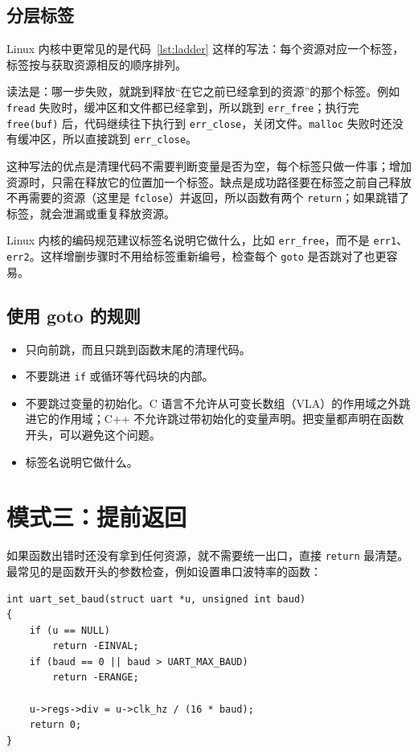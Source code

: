 \subsection{分层标签}

Linux 内核中更常见的是代码~\ref{lst:ladder} 这样的写法：每个资源对应一个标签，标签按与获取资源相反的顺序排列。


读法是：哪一步失败，就跳到释放“在它之前已经拿到的资源”的那个标签。例如 \texttt{fread} 失败时，缓冲区和文件都已经拿到，所以跳到 \texttt{err\_free}；执行完 \texttt{free(buf)} 后，代码继续往下执行到 \texttt{err\_close}，关闭文件。\texttt{malloc} 失败时还没有缓冲区，所以直接跳到 \texttt{err\_close}。

这种写法的优点是清理代码不需要判断变量是否为空，每个标签只做一件事；增加资源时，只需在释放它的位置加一个标签。缺点是成功路径要在标签之前自己释放不再需要的资源（这里是 \texttt{fclose}）并返回，所以函数有两个 \texttt{return}；如果跳错了标签，就会泄漏或重复释放资源。

Linux 内核的编码规范建议标签名说明它做什么，比如 \texttt{err\_free}，而不是 \texttt{err1}、\texttt{err2}。这样增删步骤时不用给标签重新编号，检查每个 \texttt{goto} 是否跳对了也更容易。

\subsection{使用 goto 的规则}

\begin{itemize}
  \item 只向前跳，而且只跳到函数末尾的清理代码。
  \item 不要跳进 \texttt{if} 或循环等代码块的内部。
  \item 不要跳过变量的初始化。C 语言不允许从可变长数组（VLA）的作用域之外跳进它的作用域；C++ 不允许跳过带初始化的变量声明。把变量都声明在函数开头，可以避免这个问题。
  \item 标签名说明它做什么。
\end{itemize}

\section{模式三：提前返回}
\label{sec:early-return}

如果函数出错时还没有拿到任何资源，就不需要统一出口，直接 \texttt{return} 最清楚。最常见的是函数开头的参数检查，例如设置串口波特率的函数：
\begin{verbatim}
int uart_set_baud(struct uart *u, unsigned int baud)
{
    if (u == NULL)
        return -EINVAL;
    if (baud == 0 || baud > UART_MAX_BAUD)
        return -ERANGE;

    u->regs->div = u->clk_hz / (16 * baud);
    return 0;
}
\end{verbatim}

